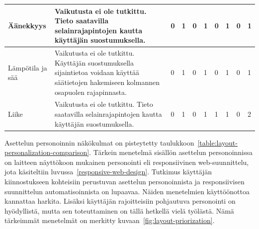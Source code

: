 \documentclass[finnish, 12pt, a4paper, elec, utf8, a-1b, online]{aaltothesis}
\begin{document}
{\begin{longtable}{p{2.5cm}|p{6cm}|p{0.5cm}p{0.5cm}p{0.5cm}|p{0.5cm}|p{0.5cm}p{0.5cm}p{0.5cm}|p{0.5cm}|}
    \midrule
    Äänekkyys                               & Vaikutusta ei ole tutkittu. Tieto saatavilla selainrajapintojen kautta käyttäjän suostumuksella.                                                                                                                                                                                                                                                                        & 0                                          & 1                                   & 0                                      & 1                            & 0                                               & 1                                         & 0                                         & 1                            \\
    \midrule
    Lämpötila ja sää                        & Vaikutusta ei ole tutkittu. Käyttäjän suostumuksella sijaintietoa voidaan käyttää säätietojen hakemiseen kolmannen osapuolen rajapinnasta.                                                                                                                                                                                                                              & 0                                          & 1                                   & 0                                      & 1                            & 0                                               & 1                                         & 0                                         & 1                            \\
    \midrule
    Liike                                   & Vaikutusta ei ole tutkittu. Tieto saatavilla selainrajapintojen kautta käyttäjän suostumuksella.                                                                                                                                                                                                                                                                        & 0                                          & 1                                   & 0                                      & 1                            & 1                                               & 1                                         & 0                                         & 2                            \\
\end{longtable}
}

Asettelun personoinnin näkökulmat on pisteytetty
taulukkoon~\ref{table:layout-personalization-comparison}. Tärkein menetelmä
sisällön asettelun personoinnissa on laitteen näyttökoon mukainen personointi
eli responsiivinen web-suunnittelu, jota käsiteltiin
luvussa~\ref{responsive-web-design}. Tutkimus käyttäjän kiinnostukseen
kohteisiin perustuvan asettelun personoinnista ja responsiivisen suunnittelun
automatisoinnista on lupaavaa. Näiden menetelmien käyttöönottoa kannattaa
harkita. Lisäksi käyttäjän rajoitteisiin pohjautuva personointi on hyödyllistä,
mutta sen toteuttaminen on tällä hetkellä vielä työlästä. Nämä tärkeimmät
menetelmät on merkitty kuvaan~\ref{fig:layout-priorization}.
\end{document}
